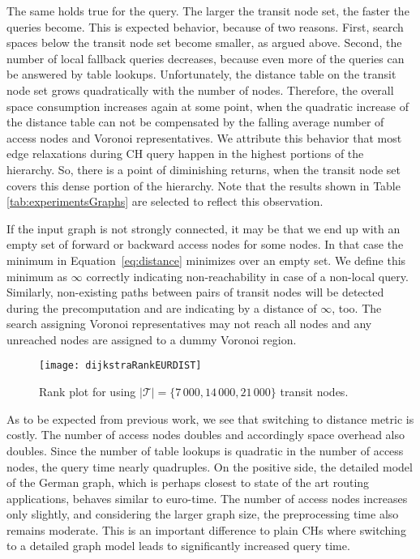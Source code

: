 \documentclass{llncs}
\begin{document}
The same holds true for the query.
The larger the transit node set, the faster the queries become.
This is expected behavior, because of two reasons.
First, search spaces below the transit node set become smaller, as argued above.
Second, the number of local fallback queries decreases, because even more of the queries can be answered by table lookups.
Unfortunately, the distance table on the transit node set grows quadratically with the number of nodes.
Therefore, the overall space consumption increases again at some point, when the quadratic increase of the distance table can not be compensated by the falling average number of access nodes and Voronoi representatives.
We attribute this behavior that most edge relaxations during CH query happen in the highest portions of the hierarchy.
So, there is a point of diminishing returns, when the transit node set covers this dense portion of the hierarchy.
Note that the results shown in Table  \ref{tab:experimentsGraphs} are selected to reflect this observation.

If the input graph is not strongly connected, it may be that we end up with an empty set of forward or backward access nodes for some nodes.
In that case the minimum in Equation~\ref{eq:distance} minimizes over an empty set.
We define this minimum as $\infty$ correctly indicating non-reachability in case of a non-local query.
Similarly, non-existing paths between pairs of transit nodes will be detected during the precomputation and are indicating by a distance of $\infty$, too.
The search assigning Voronoi representatives may not reach all nodes and any unreached nodes are assigned to a dummy Voronoi region.

\begin{figure}[b!]
	\centering
	\texttt{[image: dijkstraRankEURDIST]}
    \caption{Rank plot for using $\vert\mathcal{T}\vert=\{7\,000, 14\,000,21\,000\}$ transit nodes.}
	\label{fig:rankPlots_dist}
\end{figure}

As to be expected from previous work,
we see that switching to distance metric is costly. 
The number of access nodes doubles  and accordingly space overhead also doubles. 
Since the number of table lookups is quadratic in the number of access nodes, the query time nearly quadruples.
On the positive side, the detailed model of the German graph, which is perhaps closest to state of the art routing applications, behaves similar to euro-time. 
The number of access nodes increases only slightly, and considering the larger graph size, the preprocessing time also remains moderate. 
This is an important difference to plain CHs where switching to a detailed graph model leads to significantly increased query time. 
\end{document}
